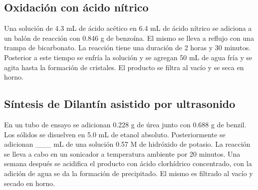\documentclass[fleqn,10pt]{SelfArx}
\begin{document}
\subsection{Oxidaci\'on con \'acido n\'itrico}
Una soluci\'on de 4.3 mL de \'acido ac\'etico en 6.4 mL de \'acido n\'itrico se adiciona a un bal\'on de reacci\'on con 0.846 g de benzo\'ina. El mismo se lleva a reflujo con una trampa de bicarbonato. La reacci\'on tiene una duraci\'on de 2 horas y 30 minutos. Posterior a este tiempo se enfr\'ia la soluci\'on y se agregan 50 mL de agua fr\'ia y se agita hasta la formaci\'on de cristales. El producto se filtra al vac\'io y se seca en horno.

\subsection{S\'intesis de Dilant\'in asistido por ultrasonido}
En un tubo de ensayo se adicionan 0.228 g de \'urea junto con 0.688 g de benzil. Los s\'olidos se disuelven en 5.0 mL de etanol absoluto. Posteriormente se adicionan \_\_\_ mL de una soluci\'on 0.57 M de hidr\'oxido de potasio. La reacci\'on se lleva a cabo en un sonicador a temperatura ambiente por 20 minutos. Una semana despu\'es se acidifica el producto con \'acido clorh\'idrico concentrado, con la adici\'on de agua se da la formaci\'on de precipitado. El mismo es filtrado al vac\'io y secado en horno. 



\end{document}

